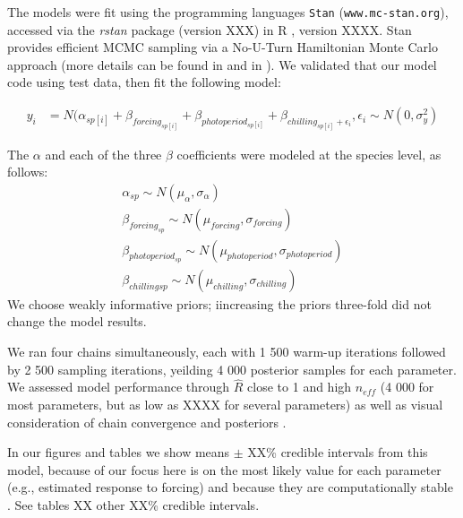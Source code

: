 \documentclass{article}
\begin{document}
The models were fit using the programming languages \texttt{Stan} \citep{Carpenter:2016aa}(\texttt{www.mc-stan.org}), accessed via the \textit{rstan} package (version XXX) in R \citep{Rcore:2017}, version XXXX. Stan provides efficient MCMC sampling via a No-U-Turn Hamiltonian Monte Carlo approach (more details can be found in \citet{BDA} and in \citet{Carpenter:2016aa}). We validated that our model code using test data, then fit the following model:

\begin{align*}
y_i &= N(\alpha_{sp[i]} + \beta_{forcing_{sp[i]}} + \beta_{photoperiod_{sp[i]}} + \beta_{chilling_{sp[i]} + \epsilon_i}, \epsilon_i \sim N(0,\sigma^2_y)
\end{align*}



\noindent The $\alpha$ and each of the three $\beta$ coefficients were modeled at the species level, as follows:
\begin{align*}
\alpha_{sp} \sim N(\mu_{\alpha}, \sigma_{\alpha}) \\
\beta_{forcing_{sp}} \sim N(\mu_{forcing}, \sigma_{forcing}) \\
\beta_{photoperiod_{sp}} \sim N(\mu_{photoperiod}, \sigma_{photoperiod})\\
\beta_{chilling{sp}} \sim N(\mu_{chilling}, \sigma_{chilling})
\end{align*}
\noindent We choose weakly informative priors; iincreasing the priors three-fold did not change the model results. 

We ran four chains simultaneously, each with 1 500 warm-up iterations followed by 2 500 sampling iterations, yeilding 4 000 posterior samples for each parameter. We assessed model performance through $\hat{R}$ close to 1 and high $n_{eff}$ (4 000 for most parameters, but as low as XXXX for several parameters) as well as visual consideration of chain convergence and posteriors \citep{BDA}. 

In our figures and tables we show means $\pm$ XX\% credible intervals from this model, because of our focus here is on the most likely value for each parameter (e.g., estimated response to forcing) and because they are computationally stable \citep{BDA,Carpenter:2016aa}. See tables XX other XX\% credible intervals. 
\end{document}
